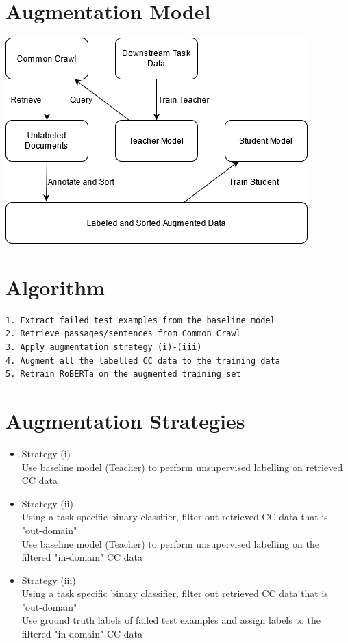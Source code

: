 \documentclass[11pt]{article}
\begin{document}
\section{Augmentation Model}
\label{sec:org2d61b07}
\begin{center}
\includegraphics[width=.9\linewidth]{./png/da.png}
\end{center}


\section{Algorithm}
\label{sec:org51e74ee}
\begin{verbatim}
1. Extract failed test examples from the baseline model
2. Retrieve passages/sentences from Common Crawl 
3. Apply augmentation strategy (i)-(iii)
4. Augment all the labelled CC data to the training data
5. Retrain RoBERTa on the augmented training set 
\end{verbatim}

\section{Augmentation Strategies}
\label{sec:org59de0c0}
\begin{itemize}
\item Strategy (i)\\
Use baseline model (Teacher) to perform unsupervised labelling on retrieved CC data
\item Strategy (ii)\\
Using a task specific binary classifier, 
filter out retrieved CC data that is "out-domain"\\
Use baseline model (Teacher) to perform unsupervised labelling on the filtered "in-domain" CC data
\item Strategy (iii)\\
Using a task specific binary classifier, 
filter out retrieved CC data that is "out-domain"\\
Use ground truth labels of failed test examples and assign labels to the filtered "in-domain" CC data
\end{itemize}
\end{document}
